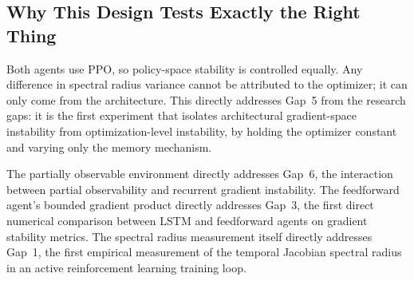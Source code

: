 \documentclass[11pt,a4paper]{article}
\begin{document}
\subsection{Why This Design Tests Exactly the Right Thing}

Both agents use PPO, so policy-space stability is controlled equally. Any difference in spectral radius variance cannot be attributed to the optimizer; it can only come from the architecture. This directly addresses Gap~5 from the research gaps: it is the first experiment that isolates architectural gradient-space instability from optimization-level instability, by holding the optimizer constant and varying only the memory mechanism.

The partially observable environment directly addresses Gap~6, the interaction between partial observability and recurrent gradient instability. The feedforward agent's bounded gradient product directly addresses Gap~3, the first direct numerical comparison between LSTM and feedforward agents on gradient stability metrics. The spectral radius measurement itself directly addresses Gap~1, the first empirical measurement of the temporal Jacobian spectral radius in an active reinforcement learning training loop.
\end{document}
